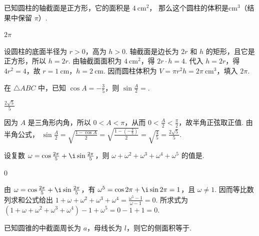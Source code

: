 \documentclass[UTF8,a4paper,oneside,11pt]{ctexbook}
\begin{document}
\begin{problem}
已知圆柱的轴截面是正方形，它的面积是 \(4\mathrm{~cm}^2\)，
那么这个圆柱的体积是\fillinblank{}\(\mathrm{cm}^3\)（结果中保留 \(\pi\)）.
\end{problem}

\begin{answer}
\(2\pi\)
\end{answer}

\begin{solution}
设圆柱的底面半径为 \(r>0\)，高为 \(h>0\). 轴截面是边长为 \(2r\) 和 \(h\) 的矩形，且它是正方形，所以 \(h=2r\). 由轴截面面积为 \(4\mathrm{~cm}^2\)，得 \(2r\cdot h=4\). 代入 \(h=2r\)，得 \(4r^2=4\)，故 \(r=1 \mathrm{~cm}\)，\(h=2 \mathrm{~cm}\). 因而圆柱体积为 \(V=\pi r^2h=2\pi \mathrm{~cm}^3\)，填入 \(2\pi\).
\end{solution}

\begin{problem}
在 \(\triangle ABC\) 中，已知 \(\cos A=-\frac{3}{5}\)，则 \(\sin\frac{A}{2}=\)\fillinblank{}.
\end{problem}

\begin{answer}
\(\frac{2\sqrt5}{5}\)
\end{answer}

\begin{solution}
因为 \(A\) 是三角形内角，所以 \(0<A<\pi\)，从而 \(0<\frac A2<\frac\pi2\)，故半角正弦取正值. 由半角公式，
\(\sin\frac A2=\sqrt{\frac{1-\cos A}{2}}=\sqrt{\frac{1-(-\frac35)}{2}}=\sqrt{\frac45}=\frac{2\sqrt5}{5}\).
\end{solution}

\begin{problem}
设复数 \(\omega=\cos\frac{2\pi}{5}+\i\sin\frac{2\pi}{5}\)，则 \(\omega+\omega^2+\omega^3+\omega^4+\omega^5\) 的值是\fillinblank{}.
\end{problem}

\begin{answer}
\(0\)
\end{answer}

\begin{solution}
由 \(\omega=\cos\frac{2\pi}{5}+\i\sin\frac{2\pi}{5}\)，有 \(\omega^5=\cos2\pi+\i\sin2\pi=1\)，且 \(\omega\ne1\). 因而等比数列求和公式给出
\(1+\omega+\omega^2+\omega^3+\omega^4=\frac{\omega^5-1}{\omega-1}=0\). 所求式为 \((1+\omega+\omega^2+\omega^3+\omega^4)-1+\omega^5=0-1+1=0\).
\end{solution}

\begin{problem}
已知圆锥的中截面周长为 \(a\)，母线长为 \(l\)，则它的侧面积等于\fillinblank{}.
\end{problem}
\end{document}
